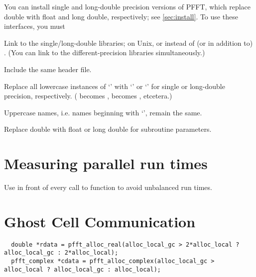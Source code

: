 You can install single and long-double precision versions of PFFT, which replace double with float and long double, respectively; see \ref{sec:install}.
To use these interfaces, you must
\begin{compactitem}
  \item Link to the single/long-double libraries; on Unix,  or  instead of (or in addition to) .
        (You can link to the different-precision libraries simultaneously.)
  \item Include the same  header file.
  \item Replace all lowercase instances of ‘’ with ‘’ or ‘’ for single or long-double precision, respectively.
        ( becomes ,  becomes , etcetera.)
  \item Uppercase names, i.e. names beginning with ‘’, remain the same.
  \item Replace double with float or long double for subroutine parameters.
\end{compactitem}

\section{Measuring parallel run times}
Use  in front of every call to  function to avoid unbalanced run times.

\section{Ghost Cell Communication}
\begin{lstlisting}
  double *rdata = pfft_alloc_real(alloc_local_gc > 2*alloc_local ? alloc_local_gc : 2*alloc_local);
  pfft_complex *cdata = pfft_alloc_complex(alloc_local_gc > alloc_local ? alloc_local_gc : alloc_local);
\end{lstlisting}
